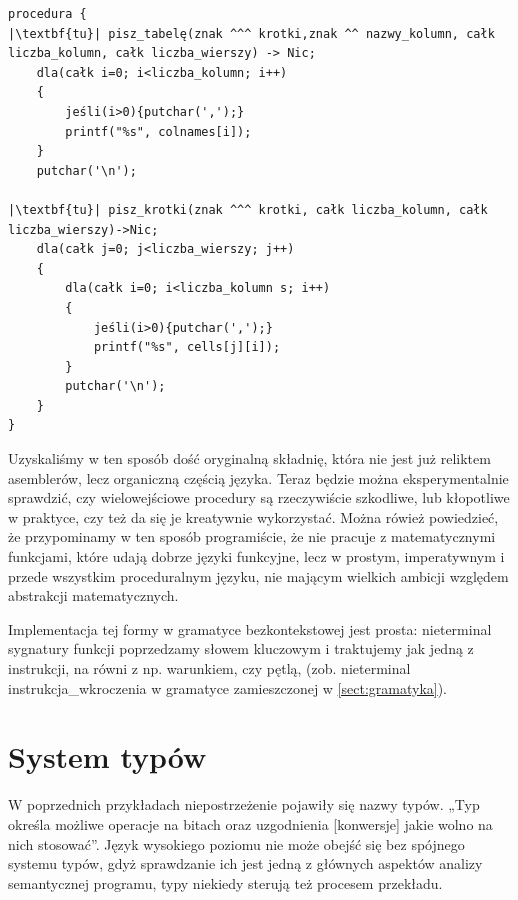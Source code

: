 
\begin{lstlisting}
procedura {
|\textbf{tu}| pisz_tabelę(znak ^^^ krotki,znak ^^ nazwy_kolumn, całk liczba_kolumn, całk liczba_wierszy) -> Nic;
    dla(całk i=0; i<liczba_kolumn; i++)
    {
        jeśli(i>0){putchar(',');}
        printf("%s", colnames[i]);
    }
    putchar('\n');
    
|\textbf{tu}| pisz_krotki(znak ^^^ krotki, całk liczba_kolumn, całk liczba_wierszy)->Nic;
    dla(całk j=0; j<liczba_wierszy; j++)
    {
        dla(całk i=0; i<liczba_kolumn s; i++)
        {
            jeśli(i>0){putchar(',');}
            printf("%s", cells[j][i]);
        }
        putchar('\n');
    }
}
\end{lstlisting}
Uzyskaliśmy w ten sposób dość oryginalną składnię, która nie jest już reliktem asemblerów, lecz organiczną częścią języka. Teraz będzie można eksperymentalnie sprawdzić, czy wielowejściowe procedury są rzeczywiście szkodliwe, lub kłopotliwe w praktyce, czy też da się je kreatywnie wykorzystać. Można rówież powiedzieć, że przypominamy w ten sposób programiście, że nie pracuje z matematycznymi funkcjami, które udają dobrze języki funkcyjne, lecz w prostym, imperatywnym i przede wszystkim proceduralnym języku, nie mającym wielkich ambicji względem abstrakcji matematycznych.

Implementacja tej formy w gramatyce bezkontekstowej jest prosta: nieterminal sygnatury funkcji poprzedzamy słowem kluczowym i traktujemy jak jedną z instrukcji, na równi z np. warunkiem, czy pętlą, (zob. nieterminal instrukcja\_wkroczenia w gramatyce zamieszczonej w \ref{sect:gramatyka}).

\section{System typów}
W poprzednich przykładach niepostrzeżenie pojawiły się nazwy typów. „Typ określa możliwe operacje na bitach oraz uzgodnienia [konwersje] jakie wolno na nich stosować”\cite[str.~259]{waite_goos}. Język wysokiego poziomu nie może obejść się bez spójnego systemu typów, gdyż sprawdzanie ich jest jedną z głównych aspektów analizy semantycznej programu, typy niekiedy sterują też procesem przekładu.

